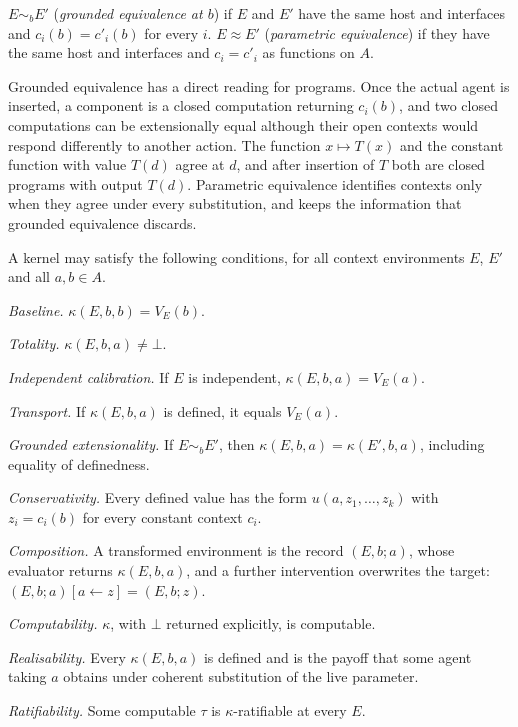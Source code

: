 \begin{definition}\label{def:equivalence}
$E\sim_bE'$ (\emph{grounded equivalence at $b$}) if $E$ and $E'$ have the same host and interfaces and
$c_i(b)=c'_i(b)$ for every $i$. $E\approx E'$ (\emph{parametric equivalence}) if they have the same
host and interfaces and $c_i=c'_i$ as functions on $A$.
\end{definition}

Grounded equivalence has a direct reading for programs. Once the actual agent is inserted, a
component is a closed computation returning $c_i(b)$, and two closed computations can be
extensionally equal although their open contexts would respond differently to another action. The
function $x\mapsto T(x)$ and the constant function with value $T(d)$ agree at $d$, and after
insertion of $T$ both are closed programs with output $T(d)$. Parametric equivalence identifies
contexts only when they agree under every substitution, and keeps the information that grounded
equivalence discards.

\begin{definition}[Desiderata]\label{def:desiderata}
A kernel may satisfy the following conditions, for all context environments $E$, $E'$ and all
$a,b\in A$.
\begin{description}[font=\normalfont\sffamily,leftmargin=3.2em,labelwidth=2.4em,labelsep=.8em,itemsep=.35em]
  \item[CF1] \emph{Baseline.} $\kappa(E,b,b)=V_E(b)$.
  \item[CF2] \emph{Totality.} $\kappa(E,b,a)\ne\bot$.
  \item[CF3] \emph{Independent calibration.} If $E$ is independent, $\kappa(E,b,a)=V_E(a)$.
  \item[CF4] \emph{Transport.} If $\kappa(E,b,a)$ is defined, it equals $V_E(a)$.
  \item[CF5] \emph{Grounded extensionality.} If $E\sim_bE'$, then $\kappa(E,b,a)=\kappa(E',b,a)$, including
        equality of definedness.
  \item[CF6] \emph{Conservativity.} Every defined value has the form $u(a,z_1,\dots,z_k)$ with $z_i=c_i(b)$
        for every constant context $c_i$.
  \item[CF7] \emph{Composition.} A transformed environment is the record $(E,b;a)$, whose evaluator
        returns $\kappa(E,b,a)$, and a further intervention overwrites the target:
        $(E,b;a)[a\leftarrow z]=(E,b;z)$.
  \item[CF8] \emph{Computability.} $\kappa$, with $\bot$ returned explicitly, is computable.
  \item[CF9] \emph{Realisability.} Every $\kappa(E,b,a)$ is defined and is the payoff that some agent taking
        $a$ obtains under coherent substitution of the live parameter.
  \item[CF10] \emph{Ratifiability.} Some computable $\tau$ is $\kappa$-ratifiable at every $E$.
\end{description}
\end{definition}

